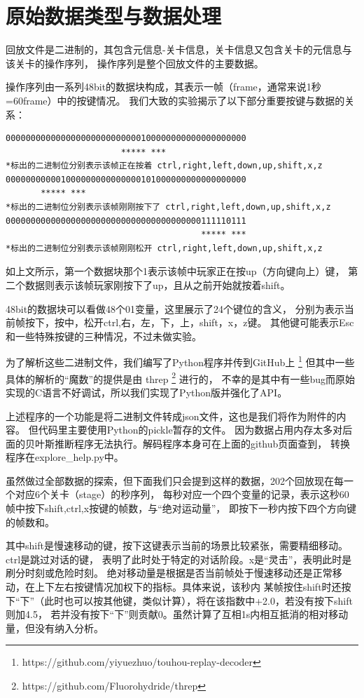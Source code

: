 \documentclass[UTF8]{ctexart}
\begin{document}
\section{原始数据类型与数据处理}

回放文件是二进制的，其包含元信息-关卡信息，关卡信息又包含关卡的元信息与该关卡的操作序列，
操作序列是整个回放文件的主要数据。

操作序列由一系列48bit的数据块构成，其表示一帧（frame，通常来说1秒=60frame）中的按键情况。
我们大致的实验揭示了以下部分重要按键与数据的关系：

\begin{verbatim}
000000000000000000000000000100000000000000000000
                       ***** ***                 
*标出的二进制位分别表示该帧正在按着 ctrl,right,left,down,up,shift,x,z
000000000001000000000000000101000000000000000000
       ***** ***                                
*标出的二进制位分别表示该帧刚刚按下了 ctrl,right,left,down,up,shift,x,z
000000000000000000000000000000000000000111110111
                                       ***** ***
*标出的二进制位分别表示该帧刚刚松开 ctrl,right,left,down,up,shift,x,z
\end{verbatim}
                                       
如上文所示，第一个数据块那个1表示该帧中玩家正在按up（方向键向上）键，
第二个数据则表示该帧玩家刚按下了up，且从之前开始就按着shift。

48bit的数据块可以看做48个01变量，这里展示了24个键位的含义，
分别为表示当前帧按下，按中，松开ctrl,右，左，下，上，shift，x，z键。
其他键可能表示Esc和一些特殊按键的三种情况，不过未做实验。

为了解析这些二进制文件，我们编写了Python程序并传到GitHub上 
\footnote{ https://github.com/yiyuezhuo/touhou-replay-decoder }
但其中一些具体的解析的“魔数”的提供是由  threp \footnote{ https://github.com/Fluorohydride/threp } 进行的，
不幸的是其中有一些bug而原始实现的C语言不好调试，所以我们实现了Python版并强化了API。

上述程序的一个功能是将二进制文件转成json文件，这也是我们将作为附件的内容。
但代码里主要使用Python的pickle暂存的文件。
因为数据占用内存太多对后面的贝叶斯推断程序无法执行。解码程序本身可在上面的github页面查到，
转换程序在explore\_help.py中。

虽然做过全部数据的探索，但下面我们只会提到这样的数据，202个回放现在每一个对应6个关卡（stage）的秒序列，
每秒对应一个四个变量的记录，表示这秒60帧中按下shift,ctrl,x按键的帧数，与“绝对运动量”，
即按下一秒内按下四个方向键的帧数和。

其中shift是慢速移动的键，按下这键表示当前的场景比较紧张，需要精细移动。ctrl是跳过对话的键，
表明了此时处于特定的对话阶段。x是“灵击”，表明此时是刷分时刻或危险时刻。
绝对移动量是根据是否当前帧处于慢速移动还是正常移动，在上下左右按键情况加权下的指标。具体来说，该秒内
某帧按住shift时还按下“下”（此时也可以按其他键，类似计算），将在该指数中+2.0，若没有按下shift则加4.5，
若并没有按下“下”则贡献0。虽然计算了互相1s内相互抵消的相对移动量，但没有纳入分析。
\end{document}

